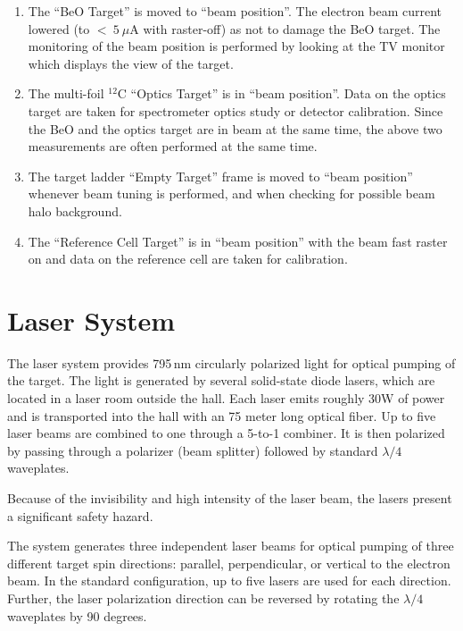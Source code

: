 {\begin{safetyen}{10}{5}
\begin{enumerate}
\item 
The ``BeO Target'' is moved to ``beam position''.
The electron beam current lowered (to $<~5~\mu$A with raster-off) 
as not to damage the 
BeO target.  The monitoring of the beam
position is performed by looking at the TV monitor which displays the
view of the target.

\item 
The multi-foil $^{12}$C ``Optics Target'' is in ``beam position''. Data on the optics
target are taken for spectrometer optics study or detector calibration.
Since the BeO and the optics target are in beam at the same time, the above 
two measurements are often performed at the same time.

\item 
The target ladder ``Empty Target''
 frame is moved to ``beam position'' whenever
beam tuning is performed, and when checking for possible beam halo
background.

\item  
The ``Reference Cell Target'' is in ``beam position'' with the beam fast
raster on and data on the reference cell are taken for calibration.


\end{enumerate}

\end{safetyen}
\section{Laser System}
\label{sec:lasers}

The laser system provides 795\,nm circularly polarized light for optical
pumping of the target. The light is generated by several solid-state
diode lasers, which are located in a laser room outside the hall.
Each laser emits roughly 30W of
power and is transported into the hall with an 75 meter long optical 
fiber. Up to five laser beams are combined to one through a 5-to-1 combiner.
It is then polarized by passing through a polarizer 
(beam splitter) followed by standard $\lambda/4$ waveplates.  
\begin{safetyen}{10}{5}
  Because of the invisibility and high intensity of the
laser beam, the lasers present a significant safety hazard.
\end{safetyen}
The system generates three independent laser beams for optical
pumping of three different target spin directions: parallel,
perpendicular, or vertical to the electron beam.  In the standard
configuration, up to five lasers are used for each direction.  
Further, the laser polarization direction can be reversed 
by rotating the $\lambda/4$ waveplates by 90 degrees.

}

